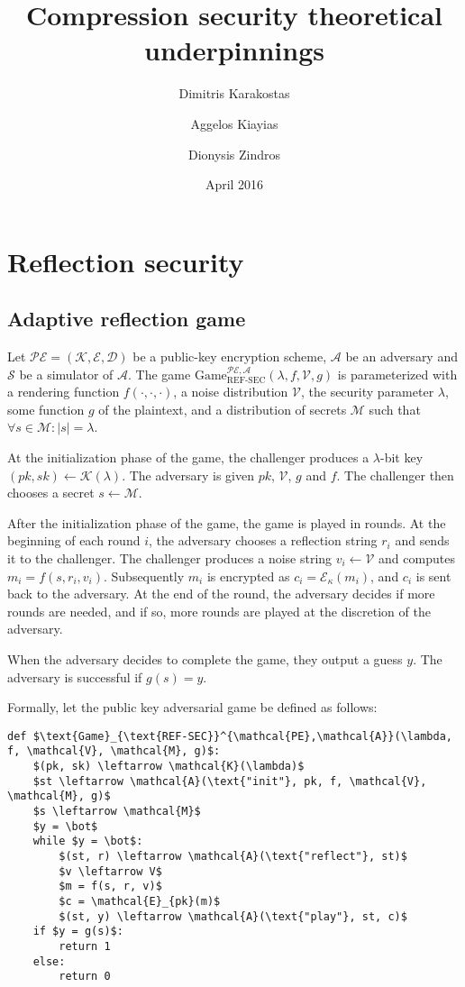 \documentclass{article}
\title{Compression security theoretical underpinnings}
\author{
Dimitris Karakostas
\and
Aggelos Kiayias
\and
Dionysis Zindros
}
\date{April 2016}
\begin{document}
\maketitle

\section{Reflection security}

\subsection{Adaptive reflection game}

Let $\mathcal{PE} = (\mathcal{K}, \mathcal{E}, \mathcal{D})$ be a public-key
encryption scheme, $\mathcal{A}$ be an adversary and $\mathcal{S}$ be a
simulator of $\mathcal{A}$.  The game
$\text{Game}_{\text{REF-SEC}}^{\mathcal{PE},\mathcal{A}}(\lambda,  f,
\mathcal{V}, g)$ is parameterized with a rendering function $f(\cdot, \cdot,
\cdot)$, a noise distribution $\mathcal{V}$, the security parameter $\lambda$,
some function $g$ of the plaintext, and a distribution of secrets $\mathcal{M}$
such that $\forall s \in \mathcal{M}: |s| = \lambda$.

At the initialization phase of the game, the challenger produces a
$\lambda$-bit key $(pk, sk) \leftarrow \mathcal{K}(\lambda)$. The adversary is
given $pk$, $\mathcal{V}$, $g$ and $f$.  The challenger then chooses a secret
$s \leftarrow \mathcal{M}$.

After the initialization phase of the game, the game is played in rounds. At
the beginning of each round $i$, the adversary chooses a reflection string
$r_i$ and sends it to the challenger. The challenger produces a noise string
$v_i \leftarrow \mathcal{V}$ and computes $m_i = f(s, r_i, v_i)$.  Subsequently
$m_i$ is encrypted as $c_i = \mathcal{E}_\kappa(m_i)$, and $c_i$ is sent back
to the adversary. At the end of the round, the adversary  decides if more
rounds are needed, and if so, more rounds are played at the discretion of the
adversary.

When the adversary decides to complete the game, they output a guess $y$. The
adversary is successful if $g(s) = y$.

Formally, let the public key adversarial game be defined as follows:

\begin{lstlisting}[texcl,mathescape]
def $\text{Game}_{\text{REF-SEC}}^{\mathcal{PE},\mathcal{A}}(\lambda, f, \mathcal{V}, \mathcal{M}, g)$:
    $(pk, sk) \leftarrow \mathcal{K}(\lambda)$
    $st \leftarrow \mathcal{A}(\text{"init"}, pk, f, \mathcal{V}, \mathcal{M}, g)$
    $s \leftarrow \mathcal{M}$
    $y = \bot$
    while $y = \bot$:
        $(st, r) \leftarrow \mathcal{A}(\text{"reflect"}, st)$
        $v \leftarrow V$
        $m = f(s, r, v)$
        $c = \mathcal{E}_{pk}(m)$
        $(st, y) \leftarrow \mathcal{A}(\text{"play"}, st, c)$
    if $y = g(s)$:
        return 1
    else:
        return 0
\end{lstlisting}
\end{document}
